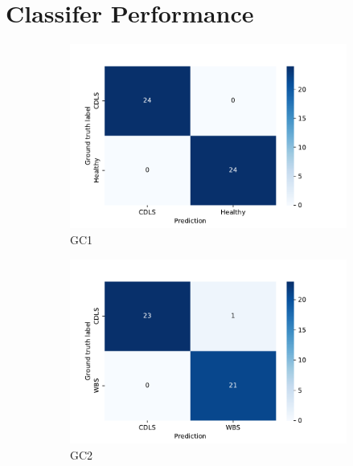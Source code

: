 \documentclass[../report.tex]{subfiles}
\begin{document}
    \chapter{Classifer Performance} \label{ch_class_perf}
    \begin{figure}[H]
    	\centering
    	\begin{subfigure}[b]{0.45\textwidth}
    		\centering
    		\includegraphics[width=\textwidth]{images/class_0n_conf.pdf}
    		\caption{GC1}
    	\end{subfigure}
    	\begin{subfigure}[b]{0.45\textwidth}
    		\centering
    		\includegraphics[width=\textwidth]{images/class_01_conf.pdf}
			\caption{GC2}
    	\end{subfigure}
    	\begin{subfigure}[b]{0.45\textwidth}
    		\centering

\end{subfigure}
\end{figure}
\end{document}
